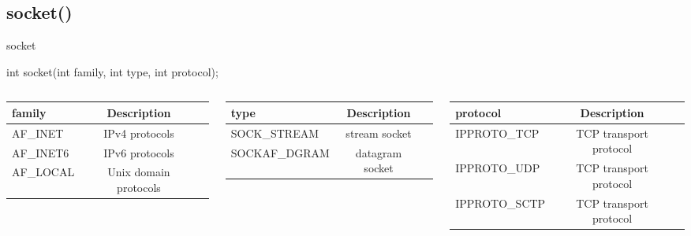 \documentclass[UTF8]{beamer}
\begin{document}
\subsection{socket()}
\begin{frame}[fragile]{socket}
  \begin{ccode}
    int socket(int family, int type, int protocol);
  \end{ccode}
  \pause
  \begin{columns}
     {
      \begin{column}{\textwidth}
        \begin{center}
          \begin{tabular}{ | l | c | r }
            \hline
            family & Description \\ \hline
            AF\_INET & IPv4 protocols \\
            AF\_INET6 & IPv6 protocols \\
            AF\_LOCAL & Unix domain protocols \\
            \hline
          \end{tabular}
        \end{center}
      \end{column}
    }
     {
      \begin{column}{\textwidth}
        \begin{center}
          \begin{tabular}{ | l | c | r }
            \hline
            type & Description \\ \hline
            SOCK\_STREAM & stream socket \\
            SOCKAF\_DGRAM & datagram socket \\
            \hline
          \end{tabular}
        \end{center}
      \end{column}
    }
     {
      \begin{column}{\textwidth}
        \begin{center}
          \begin{tabular}{ | l | c | r }
            \hline
            protocol & Description \\ \hline
            IPPROTO\_TCP & TCP transport protocol \\
            IPPROTO\_UDP & TCP transport protocol \\
            IPPROTO\_SCTP & TCP transport protocol \\
            \hline
          \end{tabular}
        \end{center}
      \end{column}
    }
  \end{columns}
\end{frame}
\end{document}
